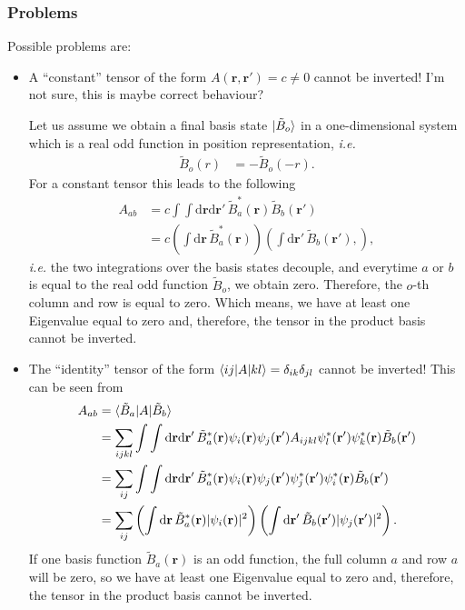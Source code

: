 \documentclass[12pt,a4paper]{scrartcl}
\numberwithin{equation}{section}
\newcommand{\cng}[1]{{\color{red}#1}}
\renewcommand{\vec}{\mathbf}
\begin{document}

\subsubsection{Problems}
Possible problems are:
\begin{itemize}
 \item A ``constant'' tensor of the form $A(\vec{r},\vec{r}')=c\neq 0$ cannot be inverted! 
 \cng{I'm not sure, this is maybe correct behaviour?}

 Let us assume we obtain a final basis state $\ket{\tilde{B}_o}$ in a one-dimensional system
 which is a real odd function in position representation, \textit{i.e.}
 \begin{align}
  \tilde{B}_o(r) &= -\tilde{B}_o(-r).
 \end{align}
For a constant tensor this leads to the following
 \begin{align}
A_{ab}
&=c \int \int \mathrm{d}\vec{r}\mathrm{d}\vec{r}' \,  \tilde{B}^*_a(\vec{r})  \tilde{B}_b(\vec{r}') \\
&=c \left(\int \mathrm{d}\vec{r} \, \tilde{B}^*_a(\vec{r}) \right) \left( \int \mathrm{d}\vec{r}'\,  \tilde{B}_b(\vec{r}'), \right),   
\end{align}
\textit{i.e.} the two integrations over the basis states decouple, and everytime $a$ or $b$ is equal to the
real odd function $\tilde{B}_o$, we obtain zero. Therefore, the $o$-th column and row is equal to zero.
Which means, we have at least one Eigenvalue equal to zero and, therefore, the tensor
in the product basis cannot be inverted.

\item The ``identity'' tensor of the form $\braket{ij|A|kl}=\delta_{ik}\delta_{jl}$ 
cannot be inverted! 
This can be seen from
\begin{align}
A_{ab}
&= \braket{ \tilde{B}_a | A | \tilde{B}_b } \\
&=\sum_{ijkl} \int \int \mathrm{d}\vec{r}\mathrm{d}\vec{r}' \,  \tilde{B}^*_a(\vec{r})  
    \psi_i(\vec{r})\psi_j(\vec{r}') A_{ijkl} \psi^*_l(\vec{r}')\psi^*_k(\vec{r}) \tilde{B}_b(\vec{r}') \\
 &=\sum_{ij} \int \int \mathrm{d}\vec{r}\mathrm{d}\vec{r}' \,  \tilde{B}^*_a(\vec{r})  
 \psi_i(\vec{r})\psi_j(\vec{r}') \psi^*_j(\vec{r}')\psi^*_i(\vec{r}) \tilde{B}_b(\vec{r}') \\
  &=\sum_{ij} \left(\int \mathrm{d}\vec{r} \,  \tilde{B}^*_a(\vec{r})  
 |\psi_i(\vec{r})|^2 \right)
 \left(\int \mathrm{d}\vec{r}' \,  \tilde{B}_b(\vec{r}')  
 |\psi_j(\vec{r}')|^2 \right).
\end{align}
 If one basis function $\tilde{B}_a(\vec{r})$ is an odd function, 
 the full column $a$ and row $a$ will be zero, so 
 we have at least one Eigenvalue equal to zero and, therefore, the tensor
in the product basis cannot be inverted.
\end{itemize}
\end{document}
